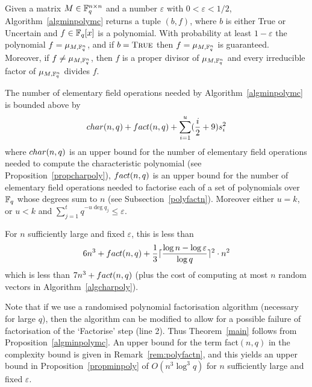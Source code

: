 \begin{Prop}\label{propminpoly}
%
Given a matrix $M \in \mathbb{F}_q^{n \times n}$ and a number
$\varepsilon$ with $0 < \varepsilon < 1/2$, Algorithm~\ref{algminpolymc}
returns a tuple $(b,f)$, where $b$ is either {\sc True} or {\sc Uncertain}
and $f \in \mathbb{F}_q[x]$ is a polynomial. With probability at least $1-\varepsilon$
the polynomial $f=\mu_{M,\mathbb{F}_q^n}$, and if
\/ $b = \mbox{\sc True}$ then
$f = \mu_{M,\mathbb{F}_q^n}$ is guaranteed. Moreover, 
if\/ $f \ne \mu_{M,\mathbb{F}_q^n}$, then 
$f$ is a proper divisor of $\mu_{M,\mathbb{F}_q^n}$ and
every irreducible factor of $\mu_{M,\mathbb{F}_q^n}$ divides $f$.

The number of elementary field operations needed by 
Algorithm~\ref{algminpolymc} is bounded above by
\[ 
{\rm char}(n,q) + {\rm fact}(n,q) + 
  \sum_{i=1}^u (\frac{i}{2}+9)s_i^2
\]
where ${\rm char}(n,q)$ is an upper bound for the number of elementary field operations needed to
compute the characteristic polynomial (see
Proposition~\ref{propcharpoly}), ${\rm fact}(n,q)$ is an upper bound for 
the number of elementary field
operations needed to factorise each of a set of polynomials over $\mathbb{F}_q$ whose degrees sum to $n$
(see Subsection~{\rm\ref{polyfactn}}). Moreover either $u=k$, or $u<k$ and
$\sum_{j=1}^t q^{-u\deg q_j} \le \varepsilon$.

For $n$ sufficiently large and fixed $\varepsilon$, this is less than
\[ 6n^3 + {\rm fact}(n,q) + 
\frac{1}{3} \lceil\frac{\log n-\log \varepsilon}{\log q}\rceil^2 \cdot n^2 
\]
which is less than $7n^3 + {\rm fact}(n,q)$ (plus the cost of computing at most $n$ random 
vectors in Algorithm~\ref{algcharpoly}).
\end{Prop}


\begin{Rem}
Note that if we use a randomised polynomial factorisation algorithm
(necessary for large $q$), then the algorithm can be modified to allow
for a possible failure of factorisation of the `Factorise' step (line
2). Thus Theorem~\ref{main} follows from Proposition~\ref{algminpolymc}.
An upper bound for the term {\rm fact}$(n,q)$ in the complexity
bound is given in Remark~{\rm\ref{rem:polyfactn}}, and this yields an
upper bound in Proposition~{\rm\ref{propminpoly}} of $O(n^3\log^3 q)$
for $n$ sufficiently large and fixed $\varepsilon$.
\end{Rem}

